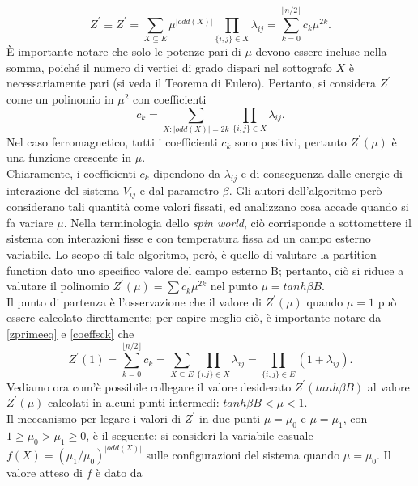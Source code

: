 \begin{equation}
	Z^{\prime} \equiv Z^{\prime} = \sum_{X \subseteq E}{\mu^{|odd(X)|}} \prod_{\{i,j\}\in X}{\lambda_{ij} = \sum_{k=0}^{\lfloor n/2 \rfloor}}{c_k\mu^{2k}}.
	\label{zprimeeq}
\end{equation}
È importante notare che solo le potenze pari di $\mu$ devono essere incluse nella somma, poiché il numero di vertici di grado dispari nel sottografo $X$ è necessariamente pari (si veda il Teorema di Eulero). Pertanto, si considera $Z^{\prime}$ come un polinomio in $\mu^2$ con coefficienti
\begin{equation}
	c_k = \sum_{X:|odd(X)|=2k}{\prod_{\{i,j\}\in X}}{\lambda_{ij}}.
	\label{coeffsck}
\end{equation}
Nel caso ferromagnetico, tutti i coefficienti $c_k$ sono positivi, pertanto $Z^{\prime}(\mu)$ è una funzione crescente in $\mu$.\\
Chiaramente, i coefficienti $c_k$ dipendono da $\lambda_{ij}$ e di conseguenza dalle energie di interazione del sistema $V_{ij}$ e dal parametro $\beta$. Gli autori dell'algoritmo però considerano tali quantità come valori fissati, ed analizzano cosa accade quando si fa variare $\mu$. Nella terminologia dello \textit{spin world}, ciò corrisponde a sottomettere il sistema con interazioni fisse e con temperatura fissa ad un campo esterno variabile. Lo scopo di tale algoritmo, però, è quello di valutare la partition function dato uno specifico valore del campo esterno B; pertanto, ciò si riduce a valutare il polinomio $Z^{\prime}(\mu) = \sum{c_k\mu^{2k}}$ nel punto $\mu = tanh\beta B$.\\
Il punto di partenza è l'osservazione che il valore di $Z^{\prime}(\mu)$ quando $\mu = 1$ può essere calcolato direttamente; per capire meglio ciò, è importante notare da \ref{zprimeeq} e \ref{coeffsck} che
\begin{equation}
	Z^{\prime}(1) = \sum_{k=0}^{\lfloor n/2\rfloor}{c_k} = \sum_{X \subseteq E}{\prod_{\{i.j\}\in X}}{\lambda_{ij}} = \prod_{\{i,j\}\in E}{(1 + \lambda_{ij})}.
	\label{zprimeone}
\end{equation}
Vediamo ora com'è possibile collegare il valore desiderato $Z^{\prime}(tanh \beta B)$ al valore $Z^{\prime}(\mu)$ calcolati in alcuni punti intermedi: $tanh\beta B < \mu < 1$.\\
Il meccanismo per legare i valori di $Z^{\prime}$ in due punti $\mu = \mu_0$ e $\mu = \mu_1$, con $1 \geq \mu_0 > \mu_1 \geq 0$, è il seguente: si consideri la variabile casuale $f(X) = (\mu_1/\mu_0)^{|odd(X)|}$ sulle configurazioni del sistema quando $\mu = \mu_0$. Il valore atteso di $f$ è dato da
